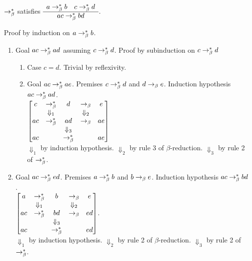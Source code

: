\begin{theorem}
  $\to^*_\beta$ satisfies
  $\begin{array}{c} 
    a\to^*_\beta b \quad
    c \to^*_\beta d \\ \hline ac \to^*_\beta bd\end{array}$.

Proof by induction on $a \to^*_\beta b$.
\begin{enumerate}
\item
  Goal $ac \to^*_\beta ad$ assuming $c  \to^*_\beta d$.
  Proof by subinduction on $c \to^*_\beta d$
  \begin{enumerate}
  \item
    Case $c = d$. Trivial by reflexivity.
  \item
    Goal $ac \to^*_\beta ae$.
    Premises $c \to^*_\beta d$ and $d \to_\beta e$.
    Induction hypothesis $ac \to^*_\beta ad$.\\
    $\begin{bmatrix}
      c   & \to^*_\beta      &  d     & \to_\beta            &   e   \\
           & \Downarrow_1 &         & \Downarrow_2 &        \\
      ac & \to^*_\beta      &  ad   & \to_\beta             &   ae \\
          &                         & \Downarrow_3 &          &        \\
      ac &                        & \to^*_\beta   &              &   ae
    \end{bmatrix}$\\
    $\Downarrow_1$ by induction hypothesis.
    $\Downarrow_2$ by rule 3 of $\beta$-reduction.
    $\Downarrow_3$ by rule 2 of $\to^*_\beta$.
  \end{enumerate}
\item
  Goal $ac \to^*_\beta ed$.
  Premises $a \to^*_\beta b$ and $b\to_\beta e$.
  Induction hypothesis $ac \to^*_\beta bd$.\\
    $\begin{bmatrix}
      a   & \to^*_\beta      &  b     & \to_\beta            &   e   \\
           & \Downarrow_1 &         & \Downarrow_2 &        \\
      ac & \to^*_\beta      & bd    & \to_\beta            &   ed \\
           &                        & \Downarrow_3 &         &        \\
      ac &                         & \to^*_\beta   &           &   ed
    \end{bmatrix}$.\\
    $\Downarrow_1$ by induction hypothesis.
    $\Downarrow_2$ by rule 2 of $\beta$-reduction.
    $\Downarrow_3$ by rule 2 of $\to^*_\beta$.
  \end{enumerate}
\end{theorem}

